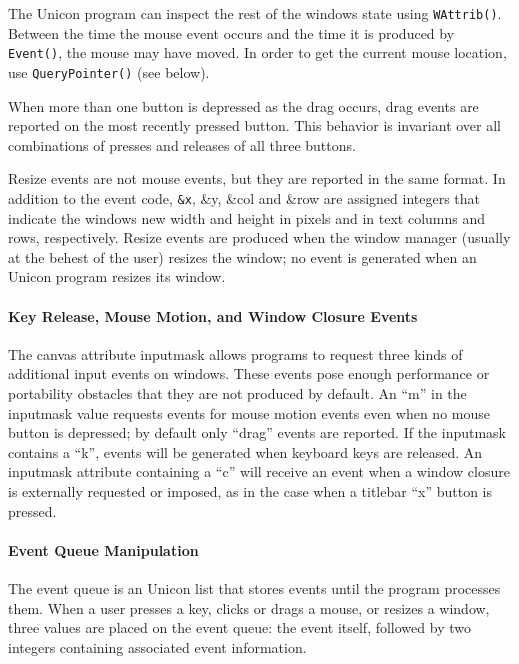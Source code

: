 The Unicon program can inspect the rest of the window{\textquotesingle}s
state using \texttt{WAttrib()}. Between the time the mouse event
occurs and the time it is produced by \texttt{Event()}, the mouse may
have moved. In order to get the current mouse location, use
\texttt{QueryPointer()} (see below).

When more than one button is depressed as the drag occurs, drag events
are reported on the most recently pressed button. This behavior is
invariant over all combinations of presses and releases of all three
buttons.

Resize events are not mouse events, but they are reported in the same
format. In addition to the event code, \texttt{\&x}, \&y, \&col and
\&row are assigned integers that indicate the window{\textquotesingle}s
new width and height in pixels and in text columns and rows,
respectively. Resize events are produced when the window manager
(usually at the behest of the user) resizes the window; no event is
generated when an Unicon program resizes its window.

\paragraph{Key Release, Mouse Motion, and Window Closure Events}
The canvas attribute inputmask allows programs to request three kinds of
additional input events on windows. These events pose enough
performance or portability obstacles that they are not produced by
default. An {\textquotedblleft}m{\textquotedblright} in the inputmask
value requests events for mouse motion events even when no mouse button
is depressed; by default only
{\textquotedblleft}drag{\textquotedblright} events are reported. If the
inputmask contains a {\textquotedblleft}k{\textquotedblright}, events
will be generated when keyboard keys are released. An inputmask
attribute containing a {\textquotedblleft}c{\textquotedblright} will
receive an event when a window closure is externally requested or
imposed, as in the case when a titlebar
{\textquotedblleft}x{\textquotedblright} button is pressed.

\paragraph{Event Queue Manipulation}
The event queue is an Unicon list that stores events until the program
processes them. When a user presses a key, clicks or drags a mouse,
or resizes a window, three values are placed on the event queue: the
event itself, followed by two integers containing associated event
information.

